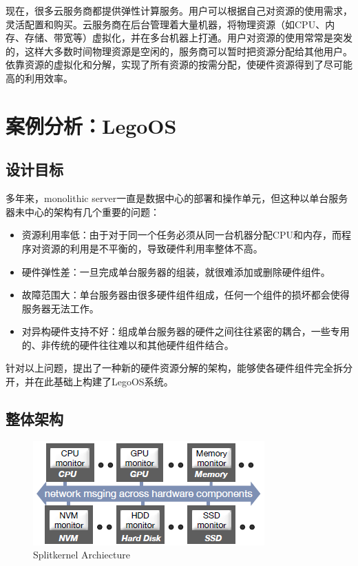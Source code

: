 现在，很多云服务商都提供弹性计算服务。用户可以根据自己对资源的使用需求，灵活配置和购买。云服务商在后台管理着大量机器，将物理资源（如CPU、内存、存储、带宽等）虚拟化，并在多台机器上打通。用户对资源的使用常常是突发的，这样大多数时间物理资源是空闲的，服务商可以暂时把资源分配给其他用户。依靠资源的虚拟化和分解，实现了所有资源的按需分配，使硬件资源得到了尽可能高的利用效率。


\section{案例分析：LegoOS}

\subsection{设计目标}

多年来，monolithic server一直是数据中心的部署和操作单元，但这种以单台服务器未中心的架构有几个重要的问题：
\begin{itemize}
\item 资源利用率低：由于对于同一个任务必须从同一台机器分配CPU和内存，而程序对资源的利用是不平衡的，导致硬件利用率整体不高。
\item 硬件弹性差：一旦完成单台服务器的组装，就很难添加或删除硬件组件。
\item 故障范围大：单台服务器由很多硬件组件组成，任何一个组件的损坏都会使得服务器无法工作。
\item 对异构硬件支持不好：组成单台服务器的硬件之间往往紧密的耦合，一些专用的、非传统的硬件往往难以和其他硬件组件结合。
\end{itemize}

针对以上问题，提出了一种新的硬件资源分解的架构，能够使各硬件组件完全拆分开，并在此基础上构建了LegoOS系统。

\subsection{整体架构}

\begin{figure}[h]
\centering
\includegraphics[scale=1.00]{Figures/legoos/splitkernel.png}
\decoRule
\caption{Splitkernel Archiecture}
\label{fig:legoos_archiecture}
\end{figure}

